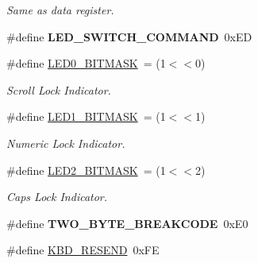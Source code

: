 \begin{DoxyCompactItemize}
\begin{DoxyCompactList}\small\item\em Same as data register. \end{DoxyCompactList}\item 
\hypertarget{group__i8042_ga03dac247194c858fc99719213fc46db2}{\#define {\bfseries L\-E\-D\-\_\-\-S\-W\-I\-T\-C\-H\-\_\-\-C\-O\-M\-M\-A\-N\-D}~0x\-E\-D}\label{group__i8042_ga03dac247194c858fc99719213fc46db2}

\item 
\hypertarget{group__i8042_ga7d3b6c84119dd4d329bfc1356c90dc90}{\#define \hyperlink{group__i8042_ga7d3b6c84119dd4d329bfc1356c90dc90}{L\-E\-D0\-\_\-\-B\-I\-T\-M\-A\-S\-K}~= (1$<$$<$0)}\label{group__i8042_ga7d3b6c84119dd4d329bfc1356c90dc90}

\begin{DoxyCompactList}\small\item\em Scroll Lock Indicator. \end{DoxyCompactList}\item 
\hypertarget{group__i8042_ga5602abb257db38d94a07092b7fa9e983}{\#define \hyperlink{group__i8042_ga5602abb257db38d94a07092b7fa9e983}{L\-E\-D1\-\_\-\-B\-I\-T\-M\-A\-S\-K}~= (1$<$$<$1)}\label{group__i8042_ga5602abb257db38d94a07092b7fa9e983}

\begin{DoxyCompactList}\small\item\em Numeric Lock Indicator. \end{DoxyCompactList}\item 
\hypertarget{group__i8042_gad8ea8b4d0fba3459bc3a5d136d7932ce}{\#define \hyperlink{group__i8042_gad8ea8b4d0fba3459bc3a5d136d7932ce}{L\-E\-D2\-\_\-\-B\-I\-T\-M\-A\-S\-K}~= (1$<$$<$2)}\label{group__i8042_gad8ea8b4d0fba3459bc3a5d136d7932ce}

\begin{DoxyCompactList}\small\item\em Caps Lock Indicator. \end{DoxyCompactList}\item 
\hypertarget{group__i8042_gaa040936a3d412cf02835c3a00375bf1c}{\#define {\bfseries T\-W\-O\-\_\-\-B\-Y\-T\-E\-\_\-\-B\-R\-E\-A\-K\-C\-O\-D\-E}~0x\-E0}\label{group__i8042_gaa040936a3d412cf02835c3a00375bf1c}

\item 
\hypertarget{group__i8042_ga73691b6156e8a39519e6999aacd37915}{\#define \hyperlink{group__i8042_ga73691b6156e8a39519e6999aacd37915}{K\-B\-D\-\_\-\-R\-E\-S\-E\-N\-D}~0x\-F\-E}\label{group__i8042_ga73691b6156e8a39519e6999aacd37915}


\end{DoxyCompactItemize}
